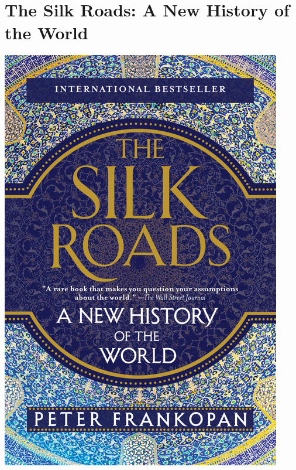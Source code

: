 \documentclass{tufte-handout}
\makeatletter
\newcommand{\varcaption}[2][0pt]{%
  \gsetlength{\@tufte@caption@vertical@offset}{-#1}%
  \gdef\@tufte@stored@varcaption{#2}%
}
\gdef\@tufte@stored@varcaption{} %
\makeatother
\begin{document}
\section*{The Silk Roads: A New History of the World}
\begin{marginfigure}[12\baselineskip]
   \includegraphics[width=\linewidth]{images/silk_roads.jpg}
   \varcaption{\href{https://www.penguinrandomhouse.com/books/253699/the-silk-roads-by-peter-frankopan/9781101912379/}{Publisher Link}, \href{https://www.amazon.com/Silk-Roads-New-History-World/dp/1101912375/}{Amazon Link}}
\end{marginfigure}
\end{document}
